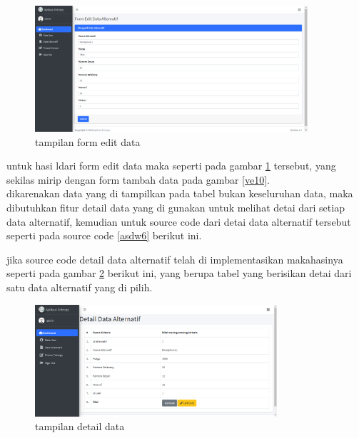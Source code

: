 \begin{figure}[!htbp]
	\centerline{\includegraphics[width=0.90\textwidth]{figures/alt/edit.png}}
	\caption{tampilan form edit data}
	\label{ve11}
\end{figure}

untuk hasi ldari form edit data maka seperti pada gambar \ref{ve11} tersebut, yang sekilas mirip dengan form tambah data pada gambar \ref{ve10}.\\


dikarenakan data yang di tampilkan pada tabel bukan keseluruhan data, maka dibutuhkan fitur detail data yang di gunakan untuk melihat detai dari setiap data alternatif, kemudian untuk source code dari detai data alternatif tersebut seperti pada source code \ref{asdw6} berikut ini.


jika source code detail data alternatif telah di implementasikan makahasinya seperti pada gambar \ref{ve12} berikut ini, yang berupa tabel yang berisikan detai dari satu data alternatif yang di pilih.
\begin{figure}[!htbp]
	\centerline{\includegraphics[width=0.80\textwidth]{figures/alt/detail.png}}
	\caption{tampilan detail data}
	\label{ve12}
\end{figure}
\pagebreak

